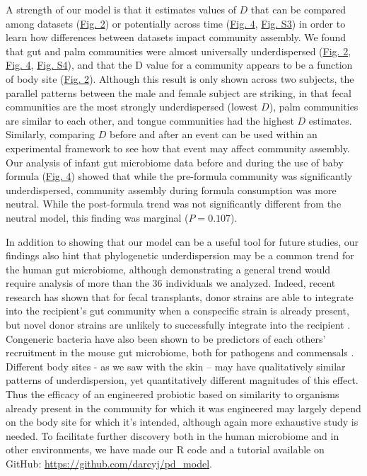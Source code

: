 \documentclass{article}
\begin{document}
A strength of our model is that it estimates values of \(D\) that can be compared among datasets (\hyperref[sec:figure2]{Fig. 2}) or potentially across time (\hyperref[sec:figure4]{Fig. 4}, \hyperref[sec:figureS3]{Fig. S3}) in order to learn how differences between datasets impact community assembly. We found that gut and palm communities were almost universally underdispersed (\hyperref[sec:figure2]{Fig. 2}, \hyperref[sec:figure4]{Fig. 4}, \hyperref[sec:figureS4]{Fig. S4}), and that the D value for a community appears to be a function of body site (\hyperref[sec:figure2]{Fig. 2}). Although this result is only shown across two subjects, the parallel patterns between the male and female subject are striking, in that fecal communities are the most strongly underdispersed (lowest \(D\)), palm communities are similar to each other, and tongue communities had the highest \(D\) estimates. Similarly, comparing \(D\) before and after an event can be used within an experimental framework to see how that event may affect community assembly. Our analysis of infant gut microbiome data \cite{Koenig2011} before and during the use of baby formula (\hyperref[sec:figure4]{Fig. 4}) showed that while the pre-formula community was significantly underdispersed, community assembly during formula consumption was more neutral. While the post-formula trend was not significantly different from the neutral model, this finding was marginal (\(P = 0.107\)). 
\par
In addition to showing that our model can be a useful tool for future studies, our findings also hint that phylogenetic underdispersion may be a common trend for the human gut microbiome, although demonstrating a general trend would require analysis of more than the 36 individuals we analyzed. Indeed, recent research has shown that for fecal transplants, donor strains are able to integrate into the recipient's gut community when a conspecific strain is already present, but novel donor strains are unlikely to successfully integrate into the recipient \cite{Li2016}. Congeneric bacteria have also been shown to be predictors of each others' recruitment in the mouse gut microbiome, both for pathogens and commensals \cite{Stecher2010}. Different body sites - as we saw with the skin – may have qualitatively similar patterns of underdispersion, yet quantitatively different magnitudes of this effect. Thus the efficacy of an engineered probiotic based on similarity to organisms already present in the community for which it was engineered may largely depend on the body site for which it's intended, although again more exhaustive study is needed. To facilitate further discovery both in the human microbiome and in other environments, we have made our R code and a tutorial available on GitHub: \url{https://github.com/darcyj/pd_model}.
\end{document}
